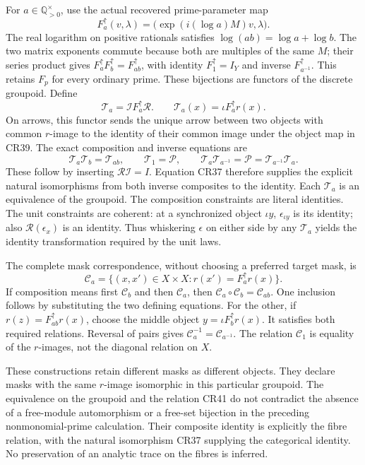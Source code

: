 \documentclass[11pt]{article}
\begin{document}
For \(a\in\mathbb Q_{>0}^{\times}\), use the actual recovered prime-parameter map
\[
F_a^\uparrow(v,\lambda)=
 \bigl(\exp(i(\log a)M)v,\lambda\bigr).
\tag{CR38}
\]
The real logarithm on positive rationals satisfies \(\log(ab)=\log a+\log b\). The two matrix exponents commute because both are multiples of the same \(M\); their series product gives \(F_a^\uparrow F_b^\uparrow=F_{ab}^\uparrow\), with identity \(F_1^\uparrow=I_Y\) and inverse \(F_{a^{-1}}^\uparrow\). This retains \(F_p\) for every ordinary prime. These bijections are functors of the discrete groupoid. Define
\[
\mathcal T_a=\mathcal I F_a^\uparrow\mathcal R.
\qquad
\mathcal T_a(x)=\iota F_a^\uparrow r(x).
\tag{CR39}
\]
On arrows, this functor sends the unique arrow between two objects with common \(r\)-image to the identity of their common image under the object map in CR39. The exact composition and inverse equations are
\[
\mathcal T_a\mathcal T_b=\mathcal T_{ab},\qquad
\mathcal T_1=\mathcal P,\qquad
\mathcal T_a\mathcal T_{a^{-1}}=\mathcal P
 =\mathcal T_{a^{-1}}\mathcal T_a.
\tag{CR40}
\]
These follow by inserting \(\mathcal R\mathcal I=I\). Equation CR37 therefore supplies the explicit natural isomorphisms from both inverse composites to the identity. Each \(\mathcal T_a\) is an equivalence of the groupoid. The composition constraints are literal identities. The unit constraints are coherent: at a synchronized object \(\iota y\), \(\epsilon_{\iota y}\) is its identity; also \(\mathcal R(\epsilon_x)\) is an identity. Thus whiskering \(\epsilon\) on either side by any \(\mathcal T_a\) yields the identity transformation required by the unit laws.

The complete mask correspondence, without choosing a preferred target mask, is
\[
\mathcal C_a=\{(x,x')\in X\times X:
                 r(x')=F_a^\uparrow r(x)\}.
\tag{CR41}
\]
If composition means first \(\mathcal C_b\) and then \(\mathcal C_a\), then
\(\mathcal C_a\circ\mathcal C_b=\mathcal C_{ab}\). One inclusion follows by substituting the two defining equations. For the other, if \(r(z)=F_{ab}^\uparrow r(x)\), choose the middle object \(y=\iota F_b^\uparrow r(x)\). It satisfies both required relations. Reversal of pairs gives \(\mathcal C_a^{-1}=\mathcal C_{a^{-1}}\). The relation \(\mathcal C_1\) is equality of the \(r\)-images, not the diagonal relation on \(X\).

These constructions retain different masks as different objects. They declare masks with the same \(r\)-image isomorphic in this particular groupoid. The equivalence on the groupoid and the relation CR41 do not contradict the absence of a free-module automorphism or a free-set bijection in the preceding nonmonomial-prime calculation. Their composite identity is explicitly the fibre relation, with the natural isomorphism CR37 supplying the categorical identity. No preservation of an analytic trace on the fibres is inferred.
\end{document}
